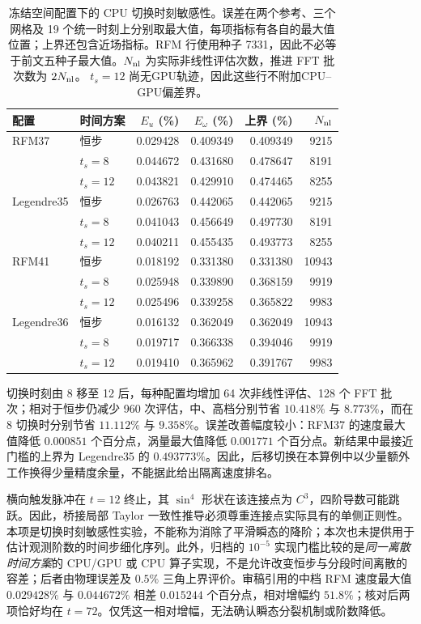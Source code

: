 \begin{table}[htbp]
\centering\small
\begin{tabular}{llrrrr}
\hline
配置 & 时间方案 & $E_u$ (\%) & $E_\omega$ (\%) & 上界 (\%) & $N_{\rm nl}$\\
\hline
RFM37 & 恒步 & 0.029428 & 0.409349 & 0.409349 & 9215\\
 & $t_s=8$ & 0.044672 & 0.431680 & 0.478647 & 8191\\
 & $t_s=12$ & 0.043821 & 0.429910 & 0.474465 & 8255\\
Legendre35 & 恒步 & 0.026763 & 0.442065 & 0.442065 & 9215\\
 & $t_s=8$ & 0.041043 & 0.456649 & 0.497730 & 8191\\
 & $t_s=12$ & 0.040211 & 0.455435 & 0.493773 & 8255\\
RFM41 & 恒步 & 0.018192 & 0.331380 & 0.331380 & 10943\\
 & $t_s=8$ & 0.025948 & 0.339890 & 0.368159 & 9919\\
 & $t_s=12$ & 0.025496 & 0.339258 & 0.365822 & 9983\\
Legendre36 & 恒步 & 0.016132 & 0.362049 & 0.362049 & 10943\\
 & $t_s=8$ & 0.019717 & 0.366338 & 0.394046 & 9919\\
 & $t_s=12$ & 0.019410 & 0.365962 & 0.391767 & 9983\\
\hline
\end{tabular}
\caption{冻结空间配置下的 CPU 切换时刻敏感性。误差在两个参考、三个网格及 19 个统一时刻上分别取最大值，每项指标有各自的最大值位置；上界还包含近场指标。RFM 行使用种子 7331，因此不必等于前文五种子最大值。$N_{\rm nl}$ 为实际非线性评估次数，推进 FFT 批次数为 $2N_{\rm nl}$。 $t_s=12$ 尚无GPU轨迹，因此这些行不附加CPU--GPU偏差界。}
\label{tab:review-switch12}
\end{table}

切换时刻由 8 移至 12 后，每种配置均增加 64 次非线性评估、128 个 FFT 批次；相对于恒步仍减少 960 次评估，中、高档分别节省 $10.418\%$ 与 $8.773\%$，而在 8 切换时分别节省 $11.112\%$ 与 $9.358\%$。误差改善幅度较小：RFM37 的速度最大值降低 $0.000851$ 个百分点，涡量最大值降低 $0.001771$ 个百分点。新结果中最接近门槛的上界为 Legendre35 的 $0.493773\%$。因此，后移切换在本算例中以少量额外工作换得少量精度余量，不能据此给出隔离速度排名。

横向触发脉冲在 $t=12$ 终止，其 $\sin^4$ 形状在该连接点为 $C^3$，四阶导数可能跳跃。因此，桥接局部 Taylor 一致性推导必须尊重连接点实际具有的单侧正则性。本项是切换时刻敏感性实验，不能称为消除了平滑瞬态的降阶；本次也未提供用于估计观测阶数的时间步细化序列。此外，归档的 $10^{-5}$ 实现门槛比较的是\emph{同一离散时间方案}的 CPU/GPU 或 CPU 算子实现，不是允许改变恒步与分段时间离散的容差；后者由物理误差及 $0.5\%$ 三角上界评价。审稿引用的中档 RFM 速度最大值 $0.029428\%$ 与 $0.044672\%$ 相差 $0.015244$ 个百分点，相对增幅约 $51.8\%$；核对后两项恰好均在 $t=72$。仅凭这一相对增幅，无法确认瞬态分裂机制或阶数降低。


